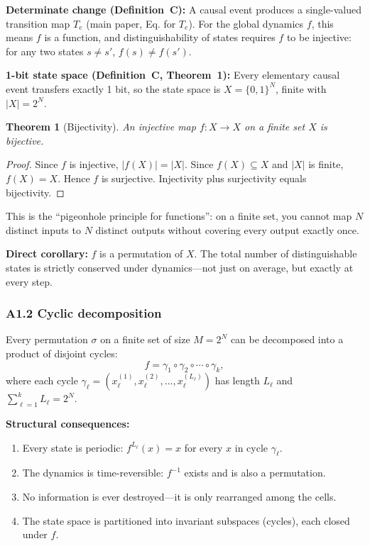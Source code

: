 \documentclass[reprint]{revtex4-2}
\newtheorem{theorem}{Theorem}
\begin{document}
\textbf{Determinate change (Definition~C):} A causal event produces a single-valued transition map $T_e$ (main paper, Eq. for $T_e$). For the global dynamics $f$, this means $f$ is a function, and distinguishability of states requires $f$ to be injective: for any two states $s\neq s'$, $f(s)\neq f(s')$.

\textbf{1-bit state space (Definition~C, Theorem~1):} Every elementary causal event transfers exactly 1 bit, so the state space is $X=\{0,1\}^N$, finite with $|X|=2^N$.

\begin{theorem}[Bijectivity]
\label{thm:bijectivity}
An injective map $f:X\to X$ on a finite set $X$ is bijective.
\end{theorem}

\begin{proof}
Since $f$ is injective, $|f(X)| = |X|$. Since $f(X)\subseteq X$ and $|X|$ is finite, $f(X)=X$. Hence $f$ is surjective. Injectivity plus surjectivity equals bijectivity.
\end{proof}

This is the ``pigeonhole principle for functions'': on a finite set, you cannot map $N$ distinct inputs to $N$ distinct outputs without covering every output exactly once.

\textbf{Direct corollary:} $f$ is a permutation of $X$. The total number of distinguishable states is strictly conserved under dynamics---not just on average, but exactly at every step.

\subsubsection{A1.2 Cyclic decomposition}

Every permutation $\sigma$ on a finite set of size $M=2^N$ can be decomposed into a product of disjoint cycles:
\begin{equation}
f = \gamma_1 \circ \gamma_2 \circ \cdots \circ \gamma_k,
\end{equation}
where each cycle $\gamma_\ell = (x_\ell^{(1)}, x_\ell^{(2)}, \ldots, x_\ell^{(L_\ell)})$ has length $L_\ell$ and $\sum_{\ell=1}^k L_\ell = 2^N$.

\textbf{Structural consequences:}
\begin{enumerate}[label=(\roman*)]
\item Every state is periodic: $f^{L_\ell}(x) = x$ for every $x$ in cycle $\gamma_\ell$.
\item The dynamics is time-reversible: $f^{-1}$ exists and is also a permutation.
\item No information is ever destroyed---it is only rearranged among the cells.
\item The state space is partitioned into invariant subspaces (cycles), each closed under $f$.
\end{enumerate}
\end{document}
